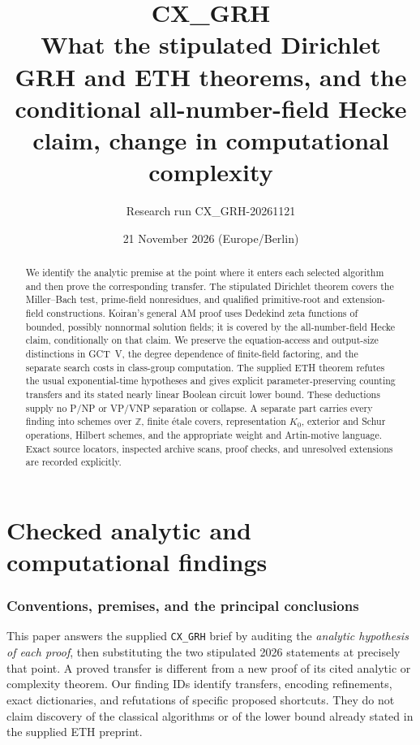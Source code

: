 \documentclass[11pt,a4paper]{article}
\title{\textbf{CX\_GRH}\\[5pt]
\large What the stipulated Dirichlet GRH and ETH theorems,\newline
and the conditional all-number-field Hecke claim,\newline
change in computational complexity}
\author{Research run CX\_GRH-20261121}
\date{21 November 2026 (Europe/Berlin)}
\begin{document}
\maketitle
\begin{abstract}
We identify the analytic premise at the point where it enters each
selected algorithm and then prove the corresponding transfer.
The stipulated Dirichlet theorem covers the Miller--Bach test,
prime-field nonresidues, and qualified primitive-root and
extension-field constructions. Koiran's general AM proof uses
Dedekind zeta functions of bounded, possibly nonnormal solution fields;
it is covered by the all-number-field Hecke claim, conditionally on
that claim. We preserve the equation-access and output-size distinctions
in GCT~V, the degree dependence of finite-field factoring, and the
separate search costs in class-group computation. The supplied ETH
theorem refutes the usual exponential-time hypotheses and gives
explicit parameter-preserving counting transfers and its stated
nearly linear Boolean circuit lower bound. These deductions supply
no P/NP or VP/VNP separation or collapse. A separate part carries
every finding into schemes over $\mathbb Z$, finite étale covers,
representation $K_0$, exterior and Schur operations, Hilbert schemes,
and the appropriate weight and Artin-motive language. Exact source
locators, inspected archive scans, proof checks, and unresolved
extensions are recorded explicitly.
\end{abstract}
\clearpage
\tableofcontents
\clearpage
\part{Checked analytic and computational findings}


\section{Conventions, premises, and the principal conclusions}
\label{sec:premises}

This paper answers the supplied \texttt{CX\_GRH} brief by auditing the
\emph{analytic hypothesis of each proof}, then substituting the two stipulated
2026 statements at precisely that point.  A proved transfer is different from
a new proof of its cited analytic or complexity theorem.  Our finding IDs
identify transfers, encoding refinements, exact dictionaries, and refutations
of specific proposed shortcuts.  They do not claim discovery of the classical
algorithms or of the lower bound already stated in the supplied ETH preprint.
\end{document}
